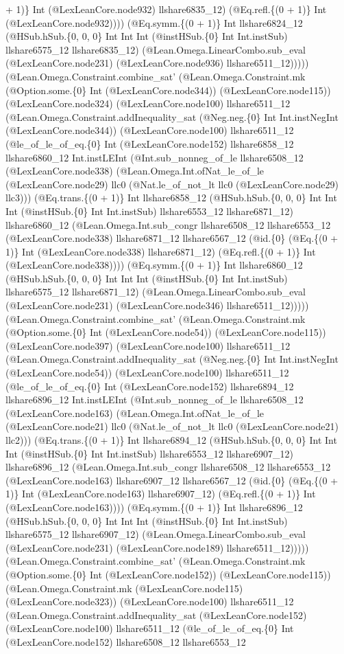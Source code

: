 \documentclass[11pt]{article}
\begin{document}
+ 1)\} Int (@LexLeanCore.node932) llshare6835\_12) (@Eq.refl.\{(0 + 1)\} Int (@LexLeanCore.node932)))) (@Eq.symm.\{(0 + 1)\} Int llshare6824\_12 (@HSub.hSub.\{0, 0, 0\} Int Int Int (@instHSub.\{0\} Int Int.instSub) llshare6575\_12 llshare6835\_12) (@Lean.Omega.LinearCombo.sub\_eval (@LexLeanCore.node231) (@LexLeanCore.node936) llshare6511\_12))))) (@Lean.Omega.Constraint.combine\_sat' (@Lean.Omega.Constraint.mk (@Option.some.\{0\} Int (@LexLeanCore.node344)) (@LexLeanCore.node115)) (@LexLeanCore.node324) (@LexLeanCore.node100) llshare6511\_12 (@Lean.Omega.Constraint.addInequality\_sat (@Neg.neg.\{0\} Int Int.instNegInt (@LexLeanCore.node344)) (@LexLeanCore.node100) llshare6511\_12 (@le\_of\_le\_of\_eq.\{0\} Int (@LexLeanCore.node152) llshare6858\_12 llshare6860\_12 Int.instLEInt (@Int.sub\_nonneg\_of\_le llshare6508\_12 (@LexLeanCore.node338) (@Lean.Omega.Int.ofNat\_le\_of\_le (@LexLeanCore.node29) llc0 (@Nat.le\_of\_not\_lt llc0 (@LexLeanCore.node29) llc3))) (@Eq.trans.\{(0 + 1)\} Int llshare6858\_12 (@HSub.hSub.\{0, 0, 0\} Int Int Int (@instHSub.\{0\} Int Int.instSub) llshare6553\_12 llshare6871\_12) llshare6860\_12 (@Lean.Omega.Int.sub\_congr llshare6508\_12 llshare6553\_12 (@LexLeanCore.node338) llshare6871\_12 llshare6567\_12 (@id.\{0\} (@Eq.\{(0 + 1)\} Int (@LexLeanCore.node338) llshare6871\_12) (@Eq.refl.\{(0 + 1)\} Int (@LexLeanCore.node338)))) (@Eq.symm.\{(0 + 1)\} Int llshare6860\_12 (@HSub.hSub.\{0, 0, 0\} Int Int Int (@instHSub.\{0\} Int Int.instSub) llshare6575\_12 llshare6871\_12) (@Lean.Omega.LinearCombo.sub\_eval (@LexLeanCore.node231) (@LexLeanCore.node346) llshare6511\_12))))) (@Lean.Omega.Constraint.combine\_sat' (@Lean.Omega.Constraint.mk (@Option.some.\{0\} Int (@LexLeanCore.node54)) (@LexLeanCore.node115)) (@LexLeanCore.node397) (@LexLeanCore.node100) llshare6511\_12 (@Lean.Omega.Constraint.addInequality\_sat (@Neg.neg.\{0\} Int Int.instNegInt (@LexLeanCore.node54)) (@LexLeanCore.node100) llshare6511\_12 (@le\_of\_le\_of\_eq.\{0\} Int (@LexLeanCore.node152) llshare6894\_12 llshare6896\_12 Int.instLEInt (@Int.sub\_nonneg\_of\_le llshare6508\_12 (@LexLeanCore.node163) (@Lean.Omega.Int.ofNat\_le\_of\_le (@LexLeanCore.node21) llc0 (@Nat.le\_of\_not\_lt llc0 (@LexLeanCore.node21) llc2))) (@Eq.trans.\{(0 + 1)\} Int llshare6894\_12 (@HSub.hSub.\{0, 0, 0\} Int Int Int (@instHSub.\{0\} Int Int.instSub) llshare6553\_12 llshare6907\_12) llshare6896\_12 (@Lean.Omega.Int.sub\_congr llshare6508\_12 llshare6553\_12 (@LexLeanCore.node163) llshare6907\_12 llshare6567\_12 (@id.\{0\} (@Eq.\{(0 + 1)\} Int (@LexLeanCore.node163) llshare6907\_12) (@Eq.refl.\{(0 + 1)\} Int (@LexLeanCore.node163)))) (@Eq.symm.\{(0 + 1)\} Int llshare6896\_12 (@HSub.hSub.\{0, 0, 0\} Int Int Int (@instHSub.\{0\} Int Int.instSub) llshare6575\_12 llshare6907\_12) (@Lean.Omega.LinearCombo.sub\_eval (@LexLeanCore.node231) (@LexLeanCore.node189) llshare6511\_12))))) (@Lean.Omega.Constraint.combine\_sat' (@Lean.Omega.Constraint.mk (@Option.some.\{0\} Int (@LexLeanCore.node152)) (@LexLeanCore.node115)) (@Lean.Omega.Constraint.mk (@LexLeanCore.node115) (@LexLeanCore.node323)) (@LexLeanCore.node100) llshare6511\_12 (@Lean.Omega.Constraint.addInequality\_sat (@LexLeanCore.node152) (@LexLeanCore.node100) llshare6511\_12 (@le\_of\_le\_of\_eq.\{0\} Int (@LexLeanCore.node152) llshare6508\_12 llshare6553\_12 
\end{document}
